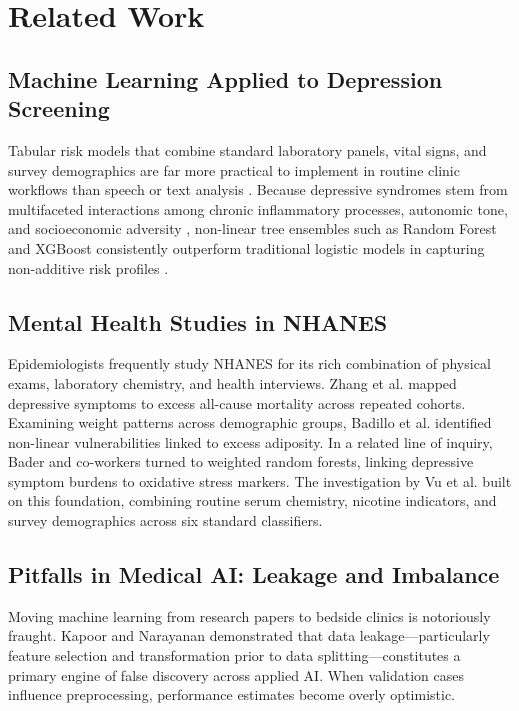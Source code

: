 \documentclass[conference]{IEEEtran}
\begin{document}
\section{Related Work}
\subsection{Machine Learning Applied to Depression Screening}
Tabular risk models that combine standard laboratory panels, vital signs, and survey demographics are far more practical to implement in routine clinic workflows than speech or text analysis \cite{nemesure2021}. Because depressive syndromes stem from multifaceted interactions among chronic inflammatory processes, autonomic tone, and socioeconomic adversity \cite{berk2013}, non-linear tree ensembles such as Random Forest and XGBoost consistently outperform traditional logistic models in capturing non-additive risk profiles \cite{chen2016}.

\subsection{Mental Health Studies in NHANES}
Epidemiologists frequently study NHANES for its rich combination of physical exams, laboratory chemistry, and health interviews. Zhang et al. \cite{zhang2023} mapped depressive symptoms to excess all-cause mortality across repeated cohorts. Examining weight patterns across demographic groups, Badillo et al. \cite{badillo2022} identified non-linear vulnerabilities linked to excess adiposity. In a related line of inquiry, Bader and co-workers \cite{bader2024} turned to weighted random forests, linking depressive symptom burdens to oxidative stress markers. The investigation by Vu et al. \cite{vu2025} built on this foundation, combining routine serum chemistry, nicotine indicators, and survey demographics across six standard classifiers.

\subsection{Pitfalls in Medical AI: Leakage and Imbalance}
Moving machine learning from research papers to bedside clinics is notoriously fraught. Kapoor and Narayanan \cite{kapoor2023} demonstrated that data leakage---particularly feature selection and transformation prior to data splitting---constitutes a primary engine of false discovery across applied AI. When validation cases influence preprocessing, performance estimates become overly optimistic.
\end{document}
